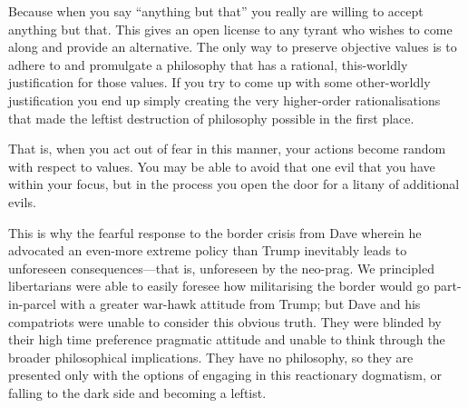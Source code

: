 \documentclass[11pt]{article}
\begin{document}
Because when you say ``anything but that'' you really are willing to accept anything but that. This gives an open license to any tyrant who wishes to come along and provide an alternative. The only way to preserve objective values is to adhere to and promulgate a philosophy that has a rational, this-worldly justification for those values. If you try to come up with some other-worldly justification you end up simply creating the very higher-order rationalisations that made the leftist destruction of philosophy possible in the first place.

That is, when you act out of fear in this manner, your actions become random with respect to values. You may be able to avoid that one evil that you have within your focus, but in the process you open the door for a litany of additional evils.

This is why the fearful response to the border crisis from Dave wherein he advocated an even-more extreme policy than Trump inevitably leads to unforeseen consequences---that is, unforeseen by the neo-prag. We principled libertarians were able to easily foresee how militarising the border would go part-in-parcel with a greater war-hawk attitude from Trump; but Dave and his compatriots were unable to consider this obvious truth. They were blinded by their high time preference pragmatic attitude and unable to think through the broader philosophical implications. They have no philosophy, so they are presented only with the options of engaging in this reactionary dogmatism, or falling to the dark side and becoming a leftist.
\end{document}
